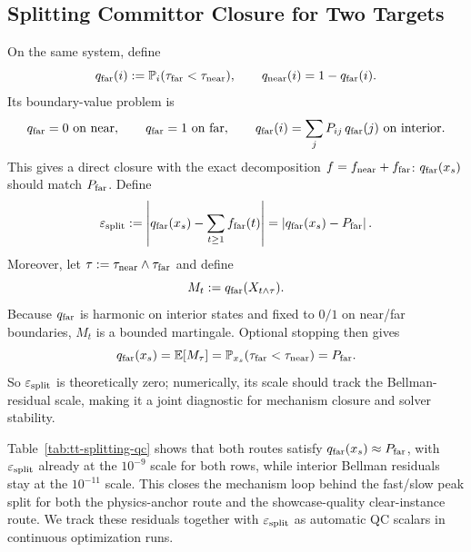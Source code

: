 \documentclass[11pt]{article}
\begin{document}
\subsection*{Splitting Committor Closure for Two Targets}
On the same system, define
\[
q_{\rm far}(i):=\mathbb P_i(\tau_{\rm far}<\tau_{\rm near}),\qquad q_{\rm near}(i)=1-q_{\rm far}(i).
\]
Its boundary-value problem is
\[
q_{\rm far}=0\ \text{on near},\qquad q_{\rm far}=1\ \text{on far},\qquad
q_{\rm far}(i)=\sum_j P_{ij}\,q_{\rm far}(j)\ \text{on interior}.
\]
This gives a direct closure with the exact decomposition $f=f_{\rm near}+f_{\rm far}$: $q_{\rm far}(x_s)$ should match $P_{\rm far}$. Define
\[
\varepsilon_{\rm split}:=\left|q_{\rm far}(x_s)-\sum_{t\ge 1}f_{\rm far}(t)\right|
=\left|q_{\rm far}(x_s)-P_{\rm far}\right|.
\]
Moreover, let $\tau:=\tau_{\rm near}\wedge\tau_{\rm far}$ and define
\[
M_t:=q_{\rm far}(X_{t\wedge\tau}).
\]
Because $q_{\rm far}$ is harmonic on interior states and fixed to $0/1$ on near/far boundaries, $M_t$ is a bounded martingale. Optional stopping then gives
\[
q_{\rm far}(x_s)=\mathbb E[M_\tau]
=\mathbb P_{x_s}(\tau_{\rm far}<\tau_{\rm near})
=P_{\rm far}.
\]
So $\varepsilon_{\rm split}$ is theoretically zero; numerically, its scale should track the Bellman-residual scale, making it a joint diagnostic for mechanism closure and solver stability.
\begin{table}[!htbp]
  \centering
  \footnotesize
  \resizebox{\linewidth}{!}{}
  \caption{Splitting-committor closure QC for no-corridor two-target runs (physics anchor, listed as ``representative'' in the legacy table, plus dedicated clear-instance): we report $q_{\rm far}(x_s)$, $P_{\rm far}$, $\varepsilon_{\rm split}$, and interior/boundary residual norms.}
  \label{tab:tt-splitting-qc}
\end{table}

Table~\ref{tab:tt-splitting-qc} shows that both routes satisfy $q_{\rm far}(x_s)\approx P_{\rm far}$, with $\varepsilon_{\rm split}$ already at the $10^{-9}$ scale for both rows, while interior Bellman residuals stay at the $10^{-11}$ scale. This closes the mechanism loop behind the fast/slow peak split for both the physics-anchor route and the showcase-quality clear-instance route. We track these residuals together with $\varepsilon_{\rm split}$ as automatic QC scalars in continuous optimization runs.
\end{document}
